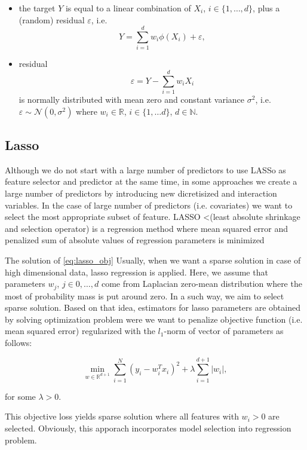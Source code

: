 \documentclass{article}
\begin{document}
\begin{itemize}
  \item the target $Y$ is equal to a linear combination of $X_i$, $i\in\{1,\ldots, d\}$, plus a (random) residual $\varepsilon$, i.e.
  \begin{equation}
    Y = \sum_{i=1}^d w_i \phi(X_i) + \varepsilon,
  \end{equation}
  \item residual $$\varepsilon = Y - \sum_{i=1}^d w_iX_i $$
  is normally distributed with mean zero and constant variance $\sigma^2$, i.e. $\varepsilon\sim \mathcal{N}(0,\sigma^2)$ where $w_i\in\mathbb{R}$, $i\in\{1,\ldots d\}$, $d\in \mathbb{N}$.
\end{itemize}

\subsection{Lasso}
Although we do not start with a large number of predictors to use LASSo as feature selector and predictor at the same time, in some approaches we create a large number of predictors by introducing new dicretisized and interaction variables. In the case of large number of predictors (i.e. covariates) we want to select the most appropriate subset of feature. LASSO \cite{tibshiraniRegressionShrinkageSelection1996} <(least absolute shrinkage and selection operator) is a regression method where mean squared error and penalized sum of absolute values of regression parameters is minimized



The solution of \ref{eq:lasso_obj}
Usually, when we want a sparse solution in case of high dimensional data, lasso regression is applied. Here, we assume that parameters $w_j$, $j\in {0,\ldots, d}$ come from Laplacian zero-mean distribution where the most of probability mass is put around zero. In a such way, we aim to select sparse solution. Based on that idea, estimators for lasso parameters are obtained by solving optimization problem were we want to penalize objective function (i.e. mean squared error) regularized with the $l_1$-norm of vector of parameters as follows:

\begin{equation}\label{eq:lasso_obj}
  \min_{w\in \mathbb{R}^{d+1}} \sum_{i=1}^N(y_i-w_i^Tx_i)^2 + \lambda\sum_{i=1}^{d+1}|w_i|,
\end{equation}

for some $\lambda>0$.


This objective loss yields sparse solution where all features with $w_i>0$ are selected. Obviously, this apporach incorporates model selection into regression problem.
\end{document}
